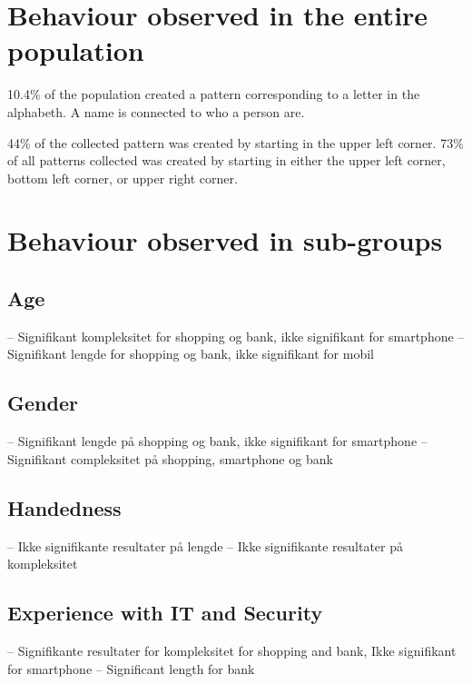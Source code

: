 	\clearpage


	\section{Behaviour observed in the entire population}

		10.4\% of the population created a pattern corresponding to a letter in the alphabeth. A name is connected to who a person are. 

		44\% of the collected pattern was created by starting in the upper left corner.
		73\% of all patterns collected was created by starting in either the upper left corner, bottom left corner, or upper right corner. 


	\section{Behaviour observed in sub-groups}

		\subsection{Age}
			-- Signifikant kompleksitet for shopping og bank, ikke signifikant for smartphone
			-- Signifikant lengde for shopping og bank, ikke signifikant for mobil

		\subsection{Gender}

			-- Signifikant lengde på shopping og bank, ikke signifikant for smartphone
			-- Signifikant compleksitet på shopping, smartphone og bank

		\subsection{Handedness}

			-- Ikke signifikante resultater på lengde 
			-- Ikke signifikante resultater på kompleksitet

		\subsection{Experience with IT and Security}

			-- Signifikante resultater for kompleksitet for shopping and bank, Ikke signifikant for smartphone
			-- Significant length for bank

